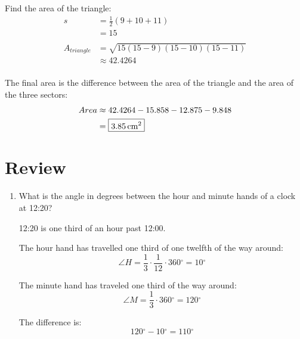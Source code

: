 \documentclass{exam}
\newcommand{\dg}{\ensuremath{^\circ}}
\begin{document}
\begin{description}
        Find the area of the triangle:
        \begin{align*}
          s  & = \frac{1}{2}(9 + 10 + 11) \\
             & = 15 \\
          \\
          A_{triangle} & = \sqrt{15 (15 - 9)(15 - 10) (15 - 11)} \\
                       & \approx 42.4264 \\
        \end{align*}

        The final area is the difference between the area of the triangle and the area of the three sectors:
        \begin{align*}
          Area & \approx 42.4264 - 15.858 - 12.875 - 9.848 \\
               & = \boxed{ \unit[3.85]{cm^2} } \\
        \end{align*}

    \end{description}

    \pagebreak
  \fi

  \section{Review}

  \begin{enumerate}
    \item What is the angle in degrees between the hour and minute hands of a clock at 12:20?

      \begin{solution}
        12:20 is one third of an hour past 12:00.  
        
        The hour hand has travelled one third of one twelfth of the way around:
        \[
          \angle H = \frac{1}{3} \cdot \frac{1}{12} \cdot 360 \dg = 10 \dg
        \]

        The minute hand has traveled one third of the way around:
        \[
          \angle M = \frac{1}{3} \cdot 360 \dg = 120 \dg
        \]

        The difference is:
        \[
          120 \dg - 10 \dg = 110 \dg
        \]

      \end{solution}

  \end{enumerate}

  \ifprintanswers
\end{document}
